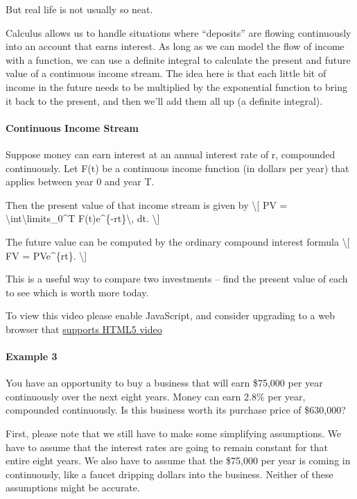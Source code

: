 But real life is not usually so neat.

Calculus allows us to handle situations where ``deposits'' are flowing
continuously into an account that earns interest. As long as we can
model the flow of income with a function, we can use a definite integral
to calculate the present and future value of a continuous income stream.
The idea here is that each little bit of income in the future needs to
be multiplied by the exponential function to bring it back to the
present, and then we'll add them all up (a definite integral).

\hypertarget{continuous-income-stream-1}{%
\paragraph{Continuous Income Stream}\label{continuous-income-stream-1}}

Suppose money can earn interest at an annual interest rate of r,
compounded continuously. Let F(t) be a continuous income function (in
dollars per year) that applies between year 0 and year T.

Then the present value of that income stream is given by
\textbackslash{}{[} PV =
\textbackslash{}int\textbackslash{}limits\_0\^{}T
F(t)e\^{}\{-rt\}\textbackslash{}, dt. \textbackslash{}{]}

The future value can be computed by the ordinary compound interest
formula \textbackslash{}{[} FV = PVe\^{}\{rt\}. \textbackslash{}{]}

This is a useful way to compare two investments -- find the present
value of each to see which is worth more today.

To view this video please enable JavaScript, and consider upgrading to a
web browser that \href{http://videojs.com/html5-video-support/}{supports
HTML5 video}

\hypertarget{example-3}{%
\paragraph{Example 3}\label{example-3}}

You have an opportunity to buy a business that will earn \$75,000 per
year continuously over the next eight years. Money can earn 2.8\% per
year, compounded continuously. Is this business worth its purchase price
of \$630,000?

First, please note that we still have to make some simplifying
assumptions. We have to assume that the interest rates are going to
remain constant for that entire eight years. We also have to assume that
the \$75,000 per year is coming in continuously, like a faucet dripping
dollars into the business. Neither of these assumptions might be
accurate.

